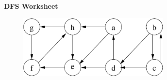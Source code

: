 \documentclass[12pt]{article}
\begin{document}
\newcommand{\I}{\mbox{{\em Int}}}
\newcommand{\lt}{\mbox{{\em left}}}
\newcommand{\rt}{\mbox{{\em right}}}
\newcommand{\ld}{\Delta^l}
\newcommand{\rd}{\Delta^r}
\newcommand{\lsp}[1]{\large\renewcommand{\baselinestretch}{#1}\normalsize}
\newcommand{\hsp}{\hspace{.2in}}

\def\Endwhile{\mbox{\bf endwhile\ }}
\def\Or{\mbox{\bf or\ }}
\def\Do{\mbox{\bf do\ }}
\def\Downto{\mbox{\bf downto\ }}
\def\Int{\mbox{\bf int\ }}
\def\To{\mbox{\bf to\ }}
\def\Repeat{\mbox{\bf repeat\ }}
\def\Until{\mbox{\bf until\ }}
\def\Return{\mbox{\bf return\ }}
\def\Not{\mbox{\bf not\ }}
\def\And{\mbox{\bf and\ }}
\def\For{\mbox{\bf for\ }}
\def\Foreach{\mbox{\bf foreach\ }}
\def\Else{\mbox{\bf else\ }}
\def\Elseif{\mbox{\bf elseif\ }}
\def\End{\mbox{\bf end\ }}
\def\If{\mbox{\bf if\ }}
\def\Mod{\mbox{\bf \ mod\ }}
\def\Then{\mbox{\bf then\ }}
\def\While{\mbox{\bf while\ }}
\def\Output{\mbox{\bf output\ }}


\lsp{1}
\pagestyle{plain}
\begin{center}
{\bf
DFS Worksheet
}
\end{center}

\begin{figure}[h]
\center{}
\includegraphics[width = 3in]{DFS.pdf}
\end{figure}
\end{document}
